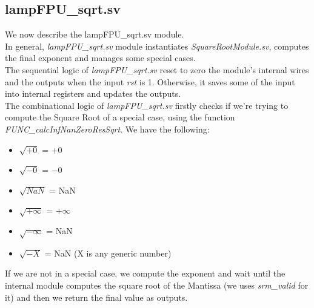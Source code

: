 \subsection{lampFPU\_sqrt.sv}
We now describe the lampFPU\_sqrt.sv module.\\
In general, \emph{lampFPU\_sqrt.sv} module instantiates \emph{SquareRootModule.sv}, computes the final exponent and manages some special cases.\\
The sequential logic of  \emph{lampFPU\_sqrt.sv} reset to zero the module's internal wires and the outputs when the input \emph{rst} is 1. Otherwise, it saves some of the input into internal registers and updates the outputs.\\
The combinational logic of \emph{lampFPU\_sqrt.sv} firstly checks if we're trying to compute the Square Root of a special case, using the function \emph{FUNC\_calcInfNanZeroResSqrt}. We have the following:
\begin{itemize}
\item $\sqrt{+0}$ = $+0$ 
\item $\sqrt{-0}$ = $-0$
\item $\sqrt{NaN}$ = NaN
\item $\sqrt{+ \infty}$  =  $+\infty$
\item $\sqrt{- \infty}$ =  NaN
\item $\sqrt{- X}$ = NaN  (X is any generic number) 
\end{itemize}

If we are not in a special case, we compute the exponent and wait until the internal module computes the square root of the Mantissa (we uses  \emph{srm_valid} for it) and then we return the final value as outputs. \\

\clearpage
